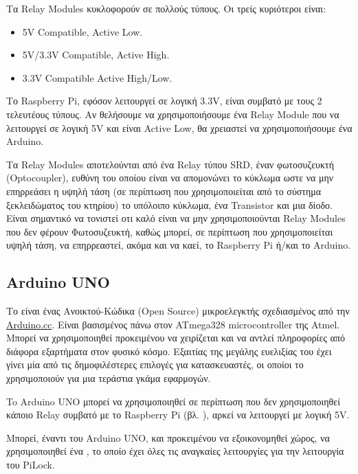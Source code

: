 		Τα Relay Modules κυκλοφορούν σε πολλούς τύπους. Οι τρείς κυριότεροι είναι:
		\begin{itemize}
			\item 5V Compatible, Active Low. 
			\item 5V/3.3V Compatible, Active High.
			\item 3.3V Compatible Active High/Low.
		\end{itemize}

		Το Raspberry Pi, εφόσον λειτουργεί σε λογική 3.3V, είναι συμβατό με τους 2 τελευτέους τύπους. Αν θελήσουμε να χρησιμοποιήσουμε ένα Relay Module που να λειτουργεί σε λογική 5V και είναι Active Low, θα χρειαστεί να χρησιμοποιήσουμε ένα Arduino.

		Τα Relay Modules αποτελούνται από ένα Relay τύπου SRD, έναν φωτοσυζευκτή (Optocoupler), ευθύνη του οποίου είναι να απομονώνει το κύκλωμα ωστε να μην επηρρεάσει η υψηλή τάση (σε περίπτωση που χρησιμοποιείται από το σύστημα ξεκλειδώματος του κτηρίου) το υπόλοιπο κύκλωμα, ένα Transistor και μια δίοδο. Είναι σημαντικό να τονιστεί οτι καλό είναι να μην χρησιμοποιούνται Relay Modules που δεν φέρουν Φωτοσυζευκτή, καθώς μπορεί, σε περίπτωση που χρησιμοποιείται υψηλή τάση, να επηρρεαστεί, ακόμα και να καεί, το Raspberry Pi ή/και το Arduino. %


	\subsection{Arduino UNO}
		Το \textbf{} είναι ένας Ανοικτού-Κώδικα (Open Source) μικροελεγκτής σχεδιασμένος από την \href{https://www.arduino.cc/}{Arduino.cc}. Είναι βασισμένος πάνω στον ATmega328 microcontroller της Atmel. Μπορεί να χρησιμοποιηθεί προκειμένου να χειρίζεται και να αντλεί πληροφορίες από διάφορα εξαρτήματα στον φυσικό κόσμο. Εξαιτίας της μεγάλης ευελιξίας του έχει γίνει μία από τις δημοφιλέστερες επιλογές για κατασκευαστές, οι οποίοι το χρησιμοποιούν για μια τεράστια γκάμα εφαρμογών.

		To Arduino UNO μπορεί να χρησιμοποιηθεί σε περίπτωση που δεν χρησιμοποιηθεί κάποιο Relay συμβατό με το Raspberry Pi (βλ. ), αρκεί να λειτουργεί με λογική 5V.

		Μπορεί, έναντι του Arduino UNO, και προκειμένου να εξοικονομηθεί χώρος, να χρησιμοποιηθεί ένα , το οποίο έχει όλες τις αναγκαίες λειτουργίες για την λειτουργία του PiLock.

